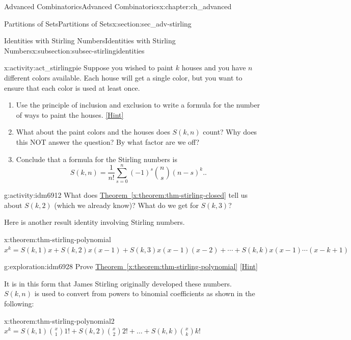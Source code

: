 \documentclass[oneside,10pt,]{book}
\numberwithin{equation}{chapter}
\begin{document}
\begin{chapterptx}{Advanced Combinatorics}{}{Advanced Combinatorics}{}{}{x:chapter:ch_advanced}
\begin{sectionptx}{Partitions of Sets}{}{Partitions of Sets}{}{}{x:section:sec_adv-stirling}
\begin{subsectionptx}{Identities with Stirling Numbers}{}{Identities with Stirling Numbers}{}{}{x:subsection:subsec-stirlingidentities}
\begin{activity}{}{x:activity:act_stirlingpie}
Suppose you wished to paint \(k\) houses and you have \(n\) different colors available.  Each house will get a single color, but you want to ensure that each color is used at least once.%
\begin{enumerate}[font=\bfseries,label=(\alph*),ref=\alph*]
\item{}Use the principle of inclusion and exclusion to write a formula for the number of ways to paint the houses.%
\space\hspace*{0pt}\hfill{\tiny\hyperlink{g:hint:idm6902-back}{[Hint]}}\item{}What about the paint colors and the houses does \(S(k,n)\) count?  Why does this NOT answer the question?  By what factor are we off?%
\item{}Conclude that a formula for the Stirling numbers is%
\begin{equation*}
S(k,n) = \frac{1}{n!}\sum_{s=0}^n (-1)^s\binom{n}{s}(n-s)^k.\text{.}
\end{equation*}
%
\end{enumerate}
\end{activity}
\begin{activity}{}{g:activity:idm6912}%
What does \hyperref[x:theorem:thm-stirling-closed]{Theorem~\ref{x:theorem:thm-stirling-closed}} tell us about \(S(k, 2)\) (which we already know)?  What do we get for \(S(k,3)\)?%
\end{activity}
Here is another result identity involving Stirling numbers.%
\begin{theorem}{}{}{x:theorem:thm-stirling-polynomial}%
\(x^{k} = S\left(k,1 \right)x + S\left(k,2 \right)x\left( x - 1 \right) + S\left(k,3 \right)x\left( x - 1 \right)\left( x - 2 \right) + \cdots
+ S\left(k,k \right)x\left( x - 1 \right)\cdots(x -k + 1)\)%
\end{theorem}
\begin{exploration}{}{g:exploration:idm6928}%
Prove \hyperref[x:theorem:thm-stirling-polynomial]{Theorem~\ref{x:theorem:thm-stirling-polynomial}}%
\space\hspace*{0pt}\hfill{\tiny\hyperlink{g:hint:idm6932-back}{[Hint]}}\end{exploration}
It is in this form that James Stirling originally developed these numbers. \(S(k,n)\) is used to convert from powers to binomial  coefficients as shown in the following:%
\begin{theorem}{}{}{x:theorem:thm-stirling-polynomial2}%
\(x^{k} = S\left(k,1 \right)\binom{x}{1}1! + S\left(k,2 \right) \binom{x}{2}2! + \ldots + S\left(k,k \right)\binom{x}{k} k!\)%

\end{theorem}
\end{subsectionptx}
\end{sectionptx}
\end{chapterptx}
\end{document}
